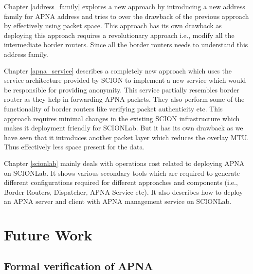 Chapter \ref{address_family} explores a new approach by introducing a new address family for APNA address and tries to over the drawback of the previous approach by effectively using packet space. This approach has its own drawback as deploying this approach requires a revolutionary approach i.e., modify all the intermediate border routers. Since all the border routers needs to understand this address family. 

Chapter \ref{apna_service} describes a completely new approach which uses the service architecture provided by SCION to implement a new service which would be responsible for providing anonymity. This service partially resembles border router as they help in forwarding APNA packets. They also perform some of the functionality of border routers like verifying packet authenticity etc. This approach requires minimal changes in the existing SCION infrastructure which makes it deployment friendly for SCIONLab. But it has its own drawback as we have seen that it introduces another packet layer which reduces the overlay MTU. Thus effectively less space present for the data.

Chapter \ref{scionlab} mainly deals with operations cost related to deploying APNA on SCIONLab. It shows various secondary tools which are required to generate different configurations required for different approaches and components (i.e., Border Routers, Dispatcher, APNA Service etc). It also describes how to deploy an APNA server and client with APNA management service on SCIONLab.

\section{Future Work}

\subsection{Formal verification of APNA}